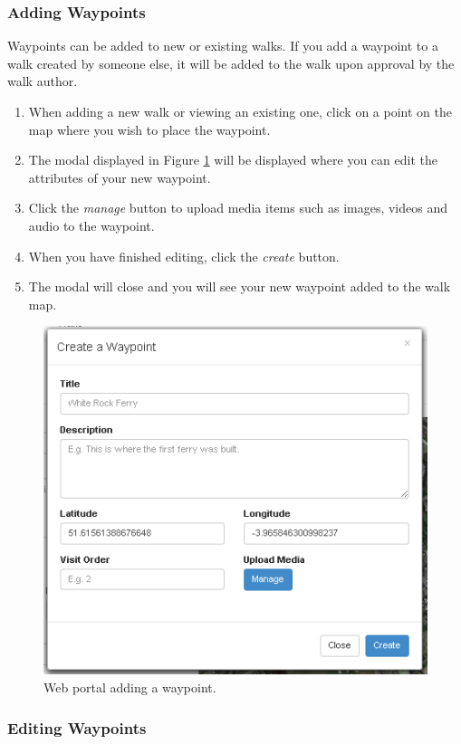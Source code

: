 \documentclass[11pt,a4paper]{report}
\begin{document}
\subsubsection{Adding Waypoints}

Waypoints can be added to new or existing walks. If you add a waypoint to a walk created by someone else, it will be added to the walk upon approval by the walk author.

\begin{enumerate}
\item When adding a new walk or viewing an existing one, click on a point on the map where you wish to place the waypoint.
\item The modal displayed in Figure \ref{fig:add-waypoint-guide} will be displayed where you can edit the attributes of your new waypoint.
\item Click the \emph{manage} button to upload media items such as images, videos and audio to the waypoint.
\item When you have finished editing, click the \emph{create} button.
\item The modal will close and you will see your new waypoint added to the walk map.
\end{enumerate}

\begin{figure}[H]
\centering
\includegraphics[width=0.7\linewidth]{./img/webportal/add-waypoint}
\caption{Web portal adding a waypoint.}
\label{fig:add-waypoint-guide}
\end{figure}


\subsubsection{Editing Waypoints}
\end{document}
